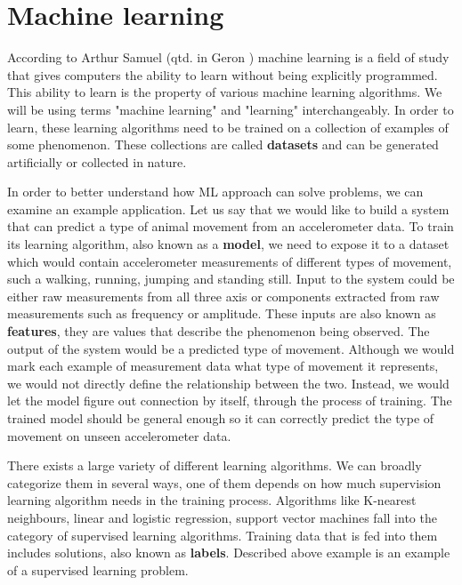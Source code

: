 \section{ Machine learning}

According to Arthur Samuel (qtd. in Geron \cite{geron}) machine learning is a field of study that gives computers the ability to learn without being explicitly programmed.
This ability to learn is the property of various machine learning algorithms.
We will be using terms "machine learning" and "learning" interchangeably. 
In order to learn, these learning algorithms need to be trained on a collection of examples of some phenomenon\cite{burkovml}. 
These collections are called \textbf{datasets} and can be generated artificially or collected in nature.

In order to better understand how ML approach can solve problems, we can examine an example application.
Let us say that we would like to build a system that can predict a type of animal movement from an accelerometer data.
To train its learning algorithm, also known as a \textbf{model}, we need to expose it to a dataset which would contain accelerometer measurements of different types of movement, such a walking, running, jumping and standing still.
Input to the system could be either raw measurements from all three axis or components extracted from raw measurements such as frequency or amplitude. 
These inputs are also known as \textbf{features}, they are values that describe the phenomenon being observed\cite{burkovml}. 
The output of the system would be a predicted type of movement.
Although we would mark each example of measurement data what type of movement it represents, we would not directly define the relationship between the two.
Instead, we would let the model figure out connection by itself, through the process of training.
The trained model should be general enough so it can correctly predict the type of movement on unseen accelerometer data.

There exists a large variety of different learning algorithms. 
We can broadly categorize them in several ways, one of them depends on how much supervision learning algorithm needs in the training process. 
Algorithms like K-nearest neighbours, linear and logistic regression, support vector machines fall into the category of supervised learning algorithms.
Training data that is fed into them includes solutions, also known as \textbf{labels}\cite{geron}.
Described above example is an example of a supervised learning problem.

